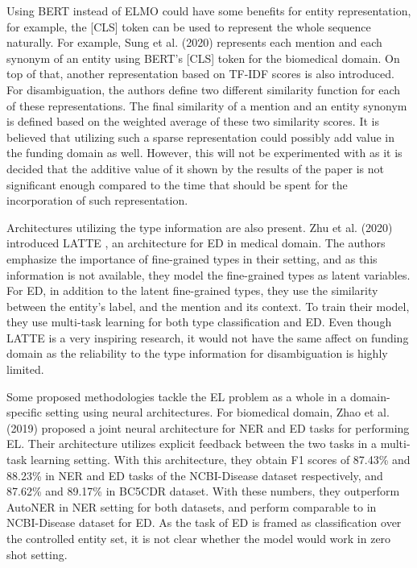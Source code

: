 \documentclass{report}
\theoremstyle{definition}
\theoremstyle{remark}
\begin{document}
Using BERT instead of ELMO could have some benefits for entity representation, for example, the [CLS] token can be used to represent the whole sequence naturally. For example, Sung et al. (2020) \cite{sung-etal} represents each mention and each synonym of an entity using BERT's [CLS] token for the biomedical domain. On top of that, another representation based on TF-IDF scores is also introduced. For disambiguation, the authors define two different similarity function for each of these representations. The final similarity of a mention and an entity synonym is defined based on the weighted average of these two similarity scores. It is believed that utilizing such a sparse representation could possibly add value in the funding domain as well. However, this will not be experimented with as it is decided that the additive value of it shown by the results of the paper is not significant enough compared to the time that should be spent for the incorporation of such representation. 

Architectures utilizing the type information are also present. Zhu et al. (2020) introduced LATTE \cite{latte}, an architecture for ED in medical domain. The authors emphasize the importance of fine-grained types in their setting, and as this information is not available, they model the fine-grained types as latent variables. For ED, in addition to the latent fine-grained types, they use the similarity between the entity's label, and the mention and its context. To train their model, they use multi-task learning for both type classification and ED. Even though LATTE is a very inspiring research, it would not have the same affect on funding domain as the reliability to the type information for disambiguation is highly limited.

Some proposed methodologies tackle the EL problem as a whole in a domain-specific setting using neural architectures. For biomedical domain, Zhao et al. (2019) \cite{MedFeedback} proposed a joint neural architecture for NER and ED tasks for performing EL. Their architecture utilizes explicit feedback between the two tasks in a multi-task learning setting. With this architecture, they obtain F1 scores of 87.43\% and 88.23\% in NER and ED tasks of the NCBI-Disease dataset respectively, and 87.62\% and 89.17\% in BC5CDR dataset. With these numbers, they outperform AutoNER in NER setting for both datasets, and perform comparable to \cite{MedicalTriplet} in NCBI-Disease dataset for ED. As the task of ED is framed as classification over the controlled entity set, it is not clear whether the model would work in zero shot setting.
\end{document}

